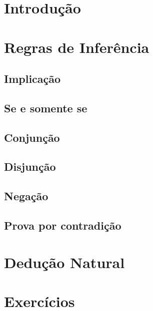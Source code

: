 \section{Introdução}

\section{Regras de Inferência}

\subsection{Implicação}
\subsection{Se e somente se}
\subsection{Conjunção}
\subsection{Disjunção}
\subsection{Negação}
\subsection{Prova por contradição}

\section{Dedução Natural}

\section{Exercícios}
